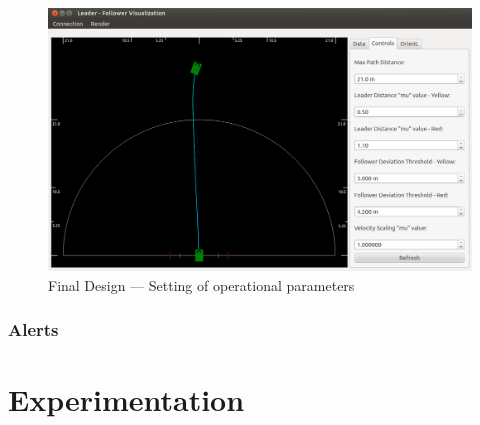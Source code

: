 \documentclass[12pt]{report}
\begin{document}

\begin{figure}[ht] \centering
    \includegraphics[width=6.5in]{./figs/final_design_opts.png}
    \caption{Final Design --- Setting of operational parameters }
    \label{fig:finaldesopts}
\end{figure}

\subsection{Alerts}
\label{sec:alerts}






\chapter{Experimentation}
\label{chap:exper}
\end{document}
